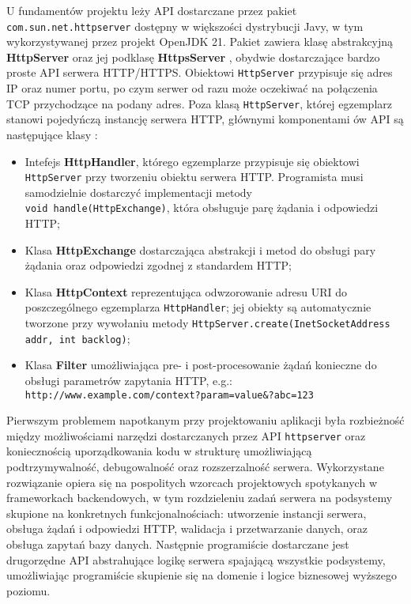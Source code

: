 \documentclass[12pt, a4paper]{article}
\begin{document}
U fundamentów projektu leży API dostarczane przez pakiet \\\texttt{com.sun.net.httpserver} dostępny w większości dystrybucji Javy, w tym wykorzystywanej przez projekt OpenJDK 21. Pakiet zawiera klasę abstrakcyjną \textbf{HttpServer} oraz jej podklasę \textbf{HttpsServer} \cite{httpsserver}, obydwie dostarczające bardzo proste API serwera HTTP/HTTPS. Obiektowi \texttt{HttpServer} przypisuje się adres IP oraz numer portu, po czym serwer od razu może oczekiwać na połączenia TCP przychodzące na podany adres.
Poza klasą \texttt{HttpServer}, której egzemplarz stanowi pojedyńczą instancję serwera HTTP, głównymi komponentami ów API są następujące klasy \cite{javapkg-httpserver}:
\begin{itemize}
    \item Intefejs \textbf{HttpHandler}, którego egzemplarze przypisuje się obiektowi \texttt{HttpServer} przy tworzeniu obiektu serwera HTTP. Programista musi samodzielnie dostarczyć implementacji metody \\\texttt{void handle(HttpExchange)}, która obsługuje parę żądania i odpowiedzi HTTP;
    \item Klasa \textbf{HttpExchange} dostarczająca abstrakcji i metod do obsługi pary żądania oraz odpowiedzi zgodnej z standardem HTTP;
    \item Klasa \textbf{HttpContext} reprezentująca odwzorowanie adresu URI do poszczególnego egzemplarza \texttt{HttpHandler}; jej obiekty są automatycznie tworzone przy wywołaniu metody \texttt{HttpServer.create(InetSocketAddress addr, int backlog)};  
    \item Klasa \textbf{Filter} umożliwiająca pre- i post-procesowanie żądań konieczne do obsługi parametrów zapytania HTTP, e.g.:  \\
\texttt{http://www.example.com/context?param=value\&?abc=123}
\end{itemize}

Pierwszym problemem napotkanym przy projektowaniu aplikacji była rozbieżność między możliwościami narzędzi dostarczanych przez API \texttt{httpserver} oraz koniecznością uporządkowania kodu w strukturę umożliwiającą podtrzymywalność, debugowalność oraz rozszerzalność serwera.
Wykorzystane rozwiązanie opiera się na pospolitych wzorcach projektowych spotykanych w frameworkach backendowych, w tym rozdzieleniu zadań serwera na podsystemy skupione na konkretnych funkcjonalnościach: utworzenie instancji serwera, obsługa żądań i odpowiedzi HTTP, walidacja i przetwarzanie danych, oraz obsługa zapytań bazy danych. Następnie programiście dostarczane jest drugorzędne API abstrahujące logikę serwera spajającą wszystkie podsystemy, umożliwiając programiście skupienie się na domenie i logice biznesowej wyższego poziomu.
\end{document}
